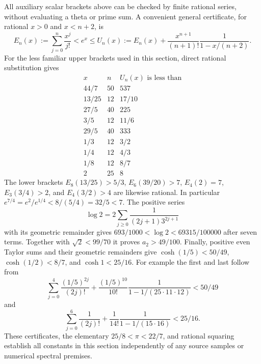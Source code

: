 All auxiliary scalar brackets above can be checked by finite rational
series, without evaluating a theta or prime sum. A convenient general
certificate, for rational $x>0$ and $x<n+2$, is
\[
 E_n(x):=\sum_{j=0}^n\frac{x^j}{j!}<e^x
 \le U_n(x):=E_n(x)+\frac{x^{n+1}}{(n+1)!}
                         \frac1{1-x/(n+2)}.
\]
For the less familiar upper brackets used in this section, direct
rational substitution gives
\[
\begin{array}{c|c|c}
 x&n&U_n(x)\text{ is less than}\\\hline
44/7&50&537\\
13/25&12&17/10\\
27/5&40&225\\
3/5&12&11/6\\
29/5&40&333\\
1/3&12&3/2\\
1/4&12&4/3\\
1/8&12&8/7\\
2&25&8
\end{array}
\]
The lower brackets $E_8(13/25)>5/3$, $E_6(39/20)>7$,
$E_4(2)=7$, $E_3(3/4)>2$, and $E_4(3/2)>4$ are likewise rational.
In particular $e^{7/4}=e^2/e^{1/4}<8/(5/4)=32/5<7$.
The positive series
\[
 \log2=2\sum_{j\ge0}\frac1{(2j+1)3^{2j+1}}
\]
with its geometric remainder gives
$693/1000<\log2<69315/100000$ after seven terms.
Together with $\sqrt2<99/70$ it proves $a_2>49/100$.
Finally, positive even Taylor sums and their geometric remainders give
$\cosh(1/5)<50/49$, $\cosh(1/2)<8/7$, and $\cosh1<25/16$.
For example the first and last follow from
\[
 \sum_{j=0}^4\frac{(1/5)^{2j}}{(2j)!}
 +\frac{(1/5)^{10}}{10!}\frac1{1-1/(25\cdot11\cdot12)}<50/49
\]
and
\[
 \sum_{j=0}^6\frac1{(2j)!}
 +\frac1{14!}\frac1{1-1/(15\cdot16)}<25/16.
\]
These certificates, the elementary $25/8<\pi<22/7$, and rational
squaring establish all constants in this section independently of any
source samples or numerical spectral premises.
